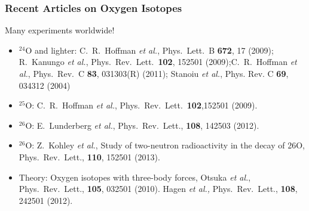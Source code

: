 \documentclass[compress]{beamer}
\begin{document}
\frame
{
  \frametitle{Recent Articles on Oxygen Isotopes}
  \begin{block}{Many experiments worldwide!}
\begin{itemize}
\item $^{24}$O and lighter:  C.~R.~Hoffman {\em et al.}, Phys.~Lett.~B {\bf 672}, 17 (2009); R.~Kanungo {\em et al.}, Phys.~Rev.~Lett.~{\bf 102}, 152501 (2009);C.~R.~Hoffman {\em et al.}, Phys.~Rev.~C {\bf 83}, 031303(R) (2011);
Stanoiu {\em et al.}, Phys. Rev. C {\bf 69}, 034312 (2004)
\item $^{25}$O: C.~R.~Hoffman {\em et al.}, Phys.~Rev.~Lett.~{\bf 102},152501  (2009). 
\item $^{26}$O: E.~Lunderberg {\it et al.}, Phys.~Rev.~Lett., {\bf 108}, 142503 (2012). 
\item $^{26}$O: Z.~Kohley  {\it et al.}, Study of two-neutron radioactivity in the decay of 26O, Phys.~Rev.~Lett., {\bf 110}, 152501 (2013). 
\item Theory: Oxygen isotopes with three-body forces,  Otsuka {\em et al.},
Phys.~Rev.~Lett., {\bf 105}, 032501  (2010).  
Hagen {\em et al.,} Phys.~Rev.~Lett., {\bf 108}, 242501 (2012). 
\end{itemize}
  \end{block}
}
\end{document}
